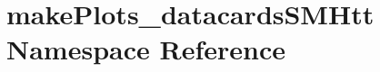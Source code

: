 \hypertarget{namespacemakePlots__datacardsSMHtt}{
\section{makePlots\_\-datacardsSMHtt Namespace Reference}
\label{namespacemakePlots__datacardsSMHtt}
}
